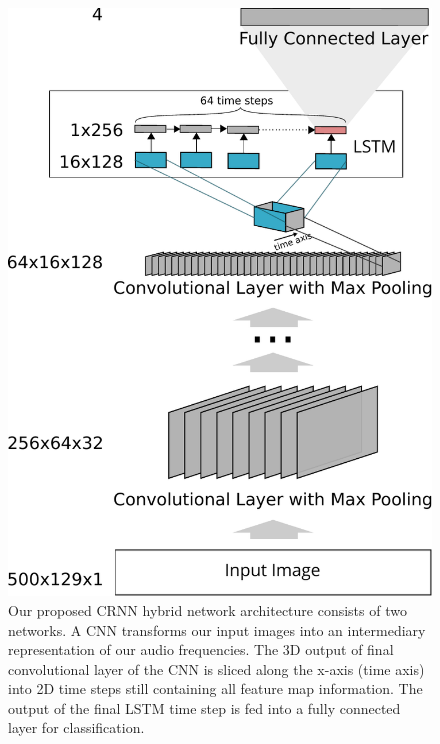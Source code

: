 	\begin{figure}[]
  		\centering
    	\includegraphics[width=\textwidth, keepaspectratio]{img/crnn.pdf}
    	\caption{Our proposed CRNN hybrid network architecture consists of two networks. A CNN transforms our input images into an intermediary representation of our audio frequencies. The 3D output of final convolutional layer of the CNN is sliced along the x-axis (time axis) into 2D time steps still containing all feature map information. The output of the final LSTM time step is fed into a fully connected layer for classification.}
    	\label{fig:crnn}
	\end{figure}
	
